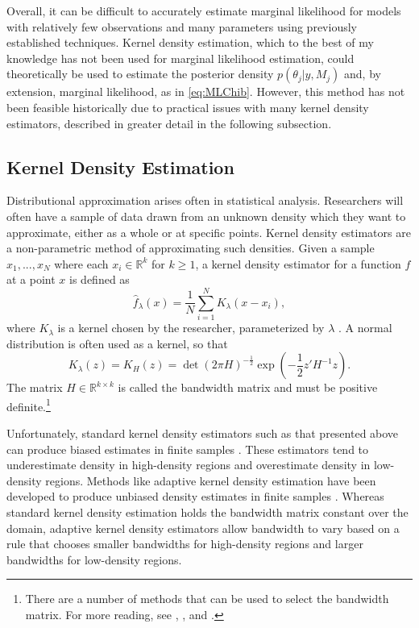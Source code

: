 \documentclass[twocolumn]{article}
\newcommand{\RR}{\mathbb{R}}
\begin{document}
Overall, it can be difficult to accurately estimate marginal likelihood for models with relatively few observations and many parameters using previously established techniques. Kernel density estimation, which to the best of my knowledge has not been used for marginal likelihood estimation, could theoretically be used to estimate the posterior density $p(\theta_j|y, M_j)$ and, by extension, marginal likelihood, as in \cref{eq:MLChib}. However, this method has not been feasible historically due to practical issues with many kernel density estimators, described in greater detail in the following subsection.

\subsection{Kernel Density Estimation}


Distributional approximation arises often in statistical analysis. Researchers will often have a sample of data drawn from an unknown density which they want to approximate, either as a whole or at specific points. Kernel density estimators are a non-parametric method of approximating such densities. Given a sample $x_1, ..., x_N$ where each $x_i\in\RR^k$ for $k\geq1$, a kernel density estimator for a function $f$ at a point $x$ is defined as
\begin{equation}
	\hat{f}_\lambda(x) = \frac{1}{N}\sum_{i=1}^N K_\lambda(x - x_i),
\end{equation}
where $K_\lambda$ is a kernel chosen by the researcher, parameterized by $\lambda$ \citep{SilvermanDE}. A normal distribution is often used as a kernel, so that
\begin{equation}
	K_\lambda(z) = K_H(z) = \det(2\pi H)^{-\frac12} \exp\left(-\frac12 z' H^{-1} z\right).
\end{equation}
The matrix $H\in\RR^{k\times k}$ is called the bandwidth matrix and must be positive definite.\footnote{There are a number of methods that can be used to select the bandwidth matrix. For more reading, see \cite{SilvermanDE}, \cite{Scott}, and \cite{SheatherJones}.}

Unfortunately, standard kernel density estimators such as that presented above can produce biased estimates in finite samples \cite{SilvermanDE}. These estimators tend to underestimate density in high-density regions and overestimate density in low-density regions. Methods like adaptive kernel density estimation have been developed to produce unbiased density estimates in finite samples \citep{Portnoy}. Whereas standard kernel density estimation holds the bandwidth matrix constant over the domain, adaptive kernel density estimators allow bandwidth to vary based on a rule that chooses smaller bandwidths for high-density regions and larger bandwidths for low-density regions.
\end{document}
